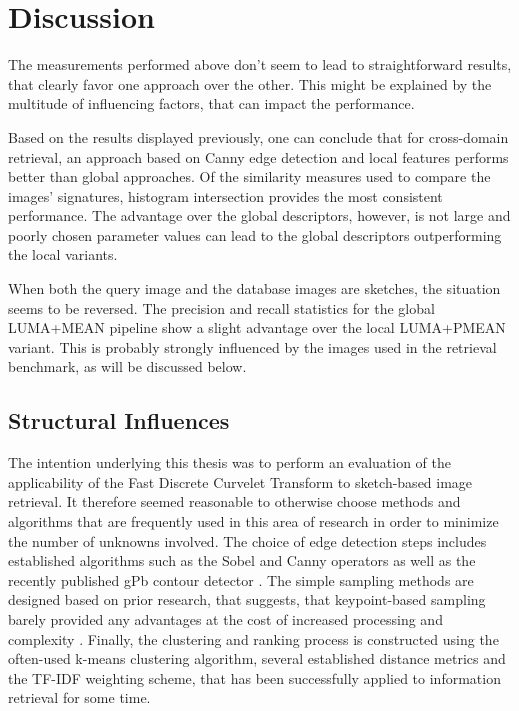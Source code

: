 \chapter{Discussion}\label{ch:discussion}

The measurements performed above don't seem to lead to straightforward results,
that clearly favor one approach over the other. This might be explained by the
multitude of influencing factors, that can impact the performance.

Based on the results displayed previously, one can conclude that for
cross-domain retrieval, an approach based on Canny edge detection and local
features performs better than global approaches. Of the similarity measures
used to compare the images' signatures, histogram intersection provides the
most consistent performance. 
The advantage over the global descriptors, however, is not large and poorly
chosen parameter values can lead to the global descriptors outperforming the
local variants.

When both the query image and the database images are sketches, the situation
seems to be reversed. The precision and recall statistics for the global
LUMA+MEAN pipeline show a slight advantage over the local LUMA+PMEAN variant.
This is probably strongly influenced by the images used in the retrieval
benchmark, as will be discussed below.

\section{Structural Influences}

The intention underlying this thesis was to perform an evaluation of the
applicability of the Fast Discrete Curvelet Transform to sketch-based image
retrieval. It therefore seemed reasonable to otherwise choose methods and
algorithms that are frequently used in this area of research in order to
minimize the number of unknowns involved. The choice of edge detection steps
includes established algorithms such as the Sobel and Canny operators as well
as the recently published gPb contour detector
\autocite{arbelaez_contour_2011}. The simple sampling methods are designed
based on prior research, that suggests, that keypoint-based sampling barely
provided any advantages at the cost of increased processing and complexity
\autocite{nowak_sampling_2006}. Finally, the clustering and ranking process is
constructed using the often-used k-means clustering algorithm, several
established distance metrics and the TF-IDF weighting scheme, that has been
successfully applied to information retrieval for some time.

